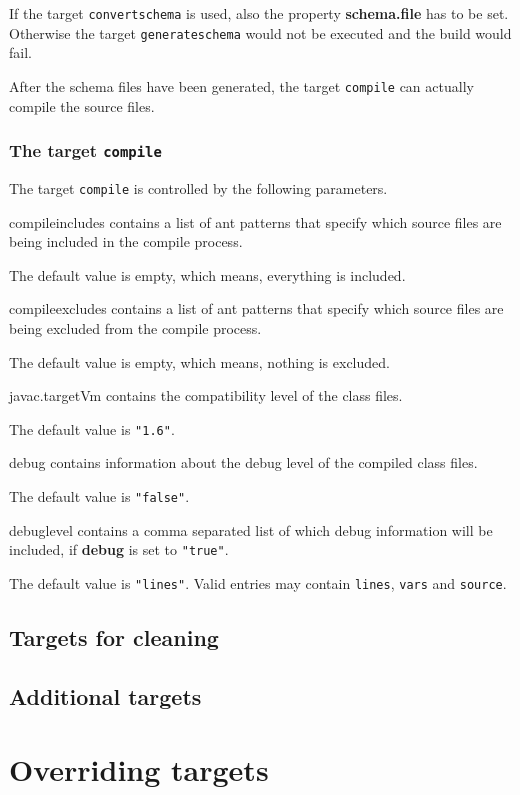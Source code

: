 \documentclass[a4paper,twoside,11pt,bibtotoc]{article}
\begin{document}
If the target \texttt{convertschema} is used, also the property \textbf{schema.file} has to be set.
Otherwise the target \texttt{generateschema} would not be executed and the build would fail.

After the schema files have been generated, the target \texttt{compile} can actually compile the source files.
\subsubsection{The target \texttt{compile}}
\label{sec:compile}
The target \texttt{compile} is controlled by the following parameters.

\begin{description*}
	\item[compileincludes] contains a list of ant patterns that specify which source files are being included in the compile process.\par The default value is empty, which means, everything is included.
	\item[compileexcludes] contains a list of ant patterns that specify which source files are being excluded from the compile process.\par The default value is empty, which means, nothing is excluded.
	\item[javac.targetVm] contains the compatibility level of the class files.\par The default value is \texttt{"1.6"}.
	\item[debug] contains information about the debug level of the compiled class files.\par The default value is \texttt{"false"}.
	\item[debuglevel] contains a comma separated list of which debug information will be included, if \textbf{debug} is set to \texttt{"true"}.\par The default value is \texttt{"lines"}. Valid entries may contain \texttt{lines}, \texttt{vars} and \texttt{source}.
\end{description*}


\subsection{Targets for cleaning}
\label{sec:cleaning}

\subsection{Additional targets}
\label{sec:additional}

\section{Overriding targets}
\label{sec:override}

\clearpage
 
%
%
%
\end{document}
